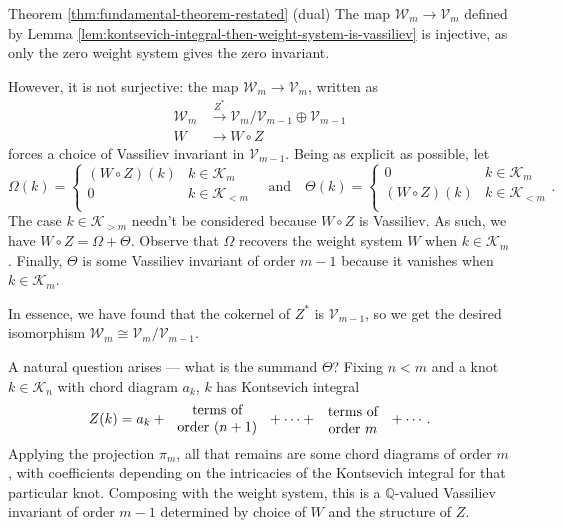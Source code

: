 \begin{proofof}{Theorem \ref{thm:fundamental-theorem-restated} (dual)}
	The map \(\mathcal{W}_{m} \to \mathcal{V}_{m}\) defined by Lemma \ref{lem:kontsevich-integral-then-weight-system-is-vassiliev}  is injective, as only the zero weight system gives the zero invariant.

	However, it is not surjective: the map \(\mathcal{W}_{m} \to \mathcal{V}_{m}\), written as
	\begin{align*}
		\mathcal{W}_{m} & \overset{Z^{\ast}}{\longrightarrow} \mathcal{V}_{m} / \mathcal{V}_{m - 1} \oplus \mathcal{V}_{m - 1}\\
		W		& \longrightarrow W \circ Z
	\end{align*}
	forces a choice of Vassiliev invariant in \(\mathcal{V}_{m - 1}\). Being as explicit as possible, let
	\[\Omega(k) =
		\begin{cases}
			(W \circ Z)(k)
			& k \in \mathcal{K}_{m}
			\\
			0
			& k \in \mathcal{K}_{< m}
			\\
		\end{cases}
		\quad \text{and} \quad
	\Theta(k) =
		\begin{cases}
			0
			& k \in \mathcal{K}_{m}
			\\
			(W \circ Z)(k)
			& k \in \mathcal{K}_{< m}
			\\
		\end{cases}
		.
	\]
	The case \(k \in \mathcal{K}_{> m}\) needn't be considered because \(W \circ Z\) is Vassiliev. As such, we have \(W \circ Z = \Omega + \Theta\). Observe that \(\Omega\) recovers the weight system \(W\) when \(k \in \mathcal{K}_{m}\). Finally, \(\Theta\) is some Vassiliev invariant of order \(m - 1\) because it vanishes when \(k \in \mathcal{K}_{m}\).

	In essence, we have found that the cokernel of \(Z^{\ast}\) is \(\mathcal{V}_{m - 1}\), so we get the desired isomorphism \(\mathcal{W}_{m} \cong \mathcal{V}_{m} / \mathcal{V}_{m - 1}\).
\end{proofof}

A natural question arises --- what is the summand \(\Theta\)? Fixing \(n < m\) and a knot \(k \in \mathcal{K}_{n}\) with chord diagram \(a_{k}\), \(k\) has Kontsevich integral
\[Z(k) = a_{k} + \parbox{2.5cm}{\centering terms of \\ order \((n + 1)\)} + \cdots + \parbox{1.8cm}{\centering terms of \\ order \(m\)} + \cdots.\]
Applying the projection \(\pi_{m}\), all that remains are some chord diagrams of order \(m\), with coefficients depending on the intricacies of the Kontsevich integral for that particular knot. Composing with the weight system, this is a \(\mathbb{Q}\)-valued Vassiliev invariant of order \(m - 1\) determined by choice of \(W\) and the structure of \(Z\).

